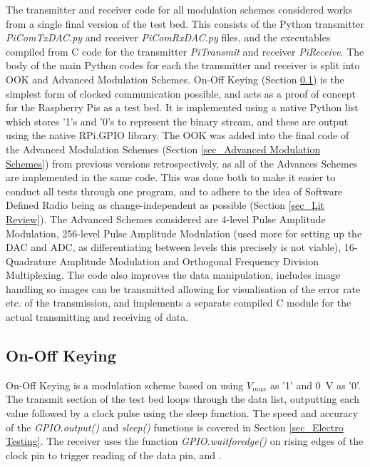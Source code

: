 \documentclass[../main.tex]{subfiles}
\begin{document}
The transmitter and receiver code for all modulation schemes considered works from a single final version of the test bed.
This consists of the Python transmitter \textit{PiComTx\textunderscore DAC.py} and receiver \textit{PiComRx\textunderscore DAC.py} files, and the executables compiled from C code for the transmitter \textit{PiTransmit} and receiver \textit{PiReceive}.
The body of the main Python codes for each the transmitter and receiver is split into OOK and Advanced Modulation Schemes.
On-Off Keying (Section \ref{sec_On-Off Keying}) is the simplest form of clocked communication possible, and acts as a proof of concept for the Raspberry Pis as a test bed.
It is implemented using a native Python list which stores '1's and '0's to represent the binary stream, and these are output using the native RPi.GPIO library.
The OOK was added into the final code of the Advanced Modulation Schemes (Section \ref{sec_Advanced Modulation Schemes})  from previous versions retrospectively, as all of the Advances Schemes are implemented in the same code.
This was done both to make it easier to conduct all tests through one program, and to adhere to the idea of Software Defined Radio being as change-independent as possible (Section \ref{sec_Lit Review}).
The Advanced Schemes considered are 4-level Pulse Amplitude Modulation, 256-level Pulse Amplitude Modulation (used more for setting up the DAC and ADC, as differentiating between levels this precisely is not viable), 16-Quadrature Amplitude Modulation and Orthogonal Frequency Division Multiplexing.
The code also improves the data manipulation, includes image handling so images can be transmitted allowing for visualisation of the error rate etc. of the transmission, and implements a separate compiled C module for the actual transmitting and receiving of data.

\subsection{On-Off Keying} \label{sec_On-Off Keying}

On-Off Keying is a modulation scheme based on using $V_{max}$ as '1' and \SI{0}{\volt} as '0'.
The transmit section of the test bed loops through the data list, outputting each value followed by a clock pulse using the sleep function.
The speed and accuracy of the \textit{GPIO.output()} and \textit{sleep()} functions is covered in Section \ref{sec_Electro Testing}.
The receiver uses the function \textit{GPIO.wait\textunderscore for\textunderscore edge()} on rising edges of the clock pin to trigger reading of the data pin, and .\\
\end{document}
